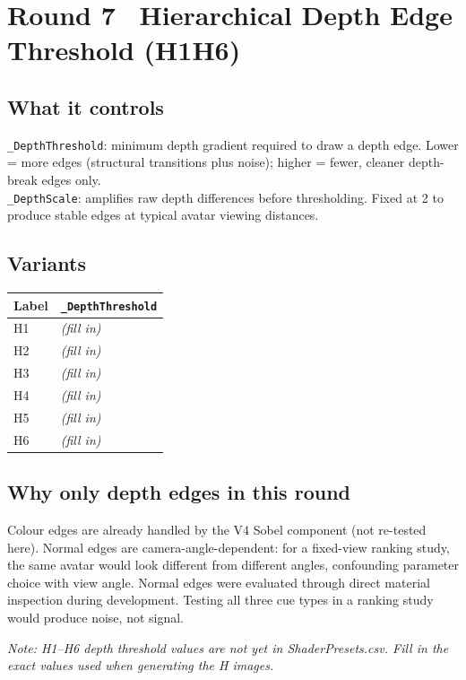 \documentclass[11pt,a4paper]{article}
\newcommand{\prop}[1]{\texttt{#1}}
\newcommand{\note}[1]{{\small\color{notegray}\textit{Note: #1}}}
\begin{document}
\bigskip

\section*{Round 7 \textemdash\ Hierarchical Depth Edge Threshold (H1\textendash H6)}

\subsection*{What it controls}
\prop{\_DepthThreshold}: minimum depth gradient required to draw a depth edge. Lower = more edges (structural transitions plus noise); higher = fewer, cleaner depth-break edges only.\\
\prop{\_DepthScale}: amplifies raw depth differences before thresholding. Fixed at 2 to produce stable edges at typical avatar viewing distances.

\subsection*{Variants}

\begin{tabular}{ll}
\toprule
\textbf{Label} & \prop{\_DepthThreshold} \\
\midrule
H1 & \textit{(fill in)} \\
H2 & \textit{(fill in)} \\
H3 & \textit{(fill in)} \\
H4 & \textit{(fill in)} \\
H5 & \textit{(fill in)} \\
H6 & \textit{(fill in)} \\
\bottomrule
\end{tabular}

\subsection*{Why only depth edges in this round}
Colour edges are already handled by the V4 Sobel component (not re-tested here). Normal edges are camera-angle-dependent: for a fixed-view ranking study, the same avatar would look different from different angles, confounding parameter choice with view angle. Normal edges were evaluated through direct material inspection during development. Testing all three cue types in a ranking study would produce noise, not signal.

\note{H1--H6 depth threshold values are not yet in ShaderPresets.csv. Fill in the exact values used when generating the H images.}
\end{document}
